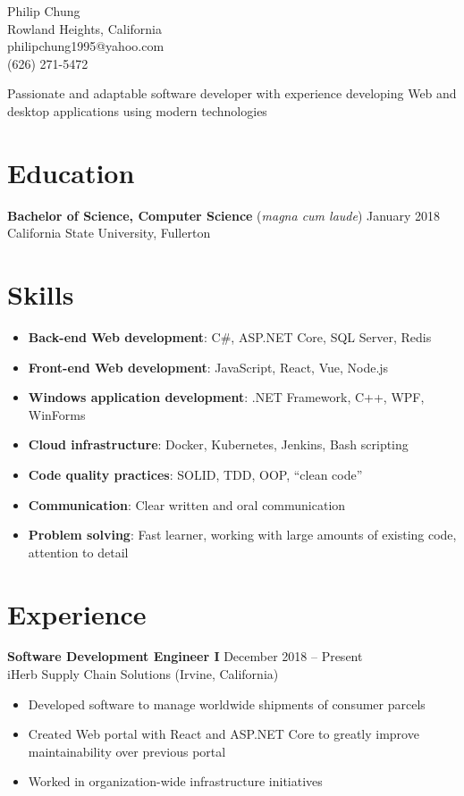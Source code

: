 \documentclass[10pt]{article}
\newcommand{\baseheader}[3]{#1 \hfill #2 \\ #3}
\newcommand{\locheader}[4]{\baseheader{\textbf{#1}}{#2}{#3 (#4)}}
\begin{document}
	\begin{center}
		{\LARGE Philip Chung} \\
		Rowland Heights, California \\
		philipchung1995@yahoo.com \\
		(626) 271-5472 \\
	\end{center}

	Passionate and adaptable software developer with experience developing Web and desktop applications using modern technologies

	\section*{Education}

	\baseheader{\textbf{Bachelor of Science, Computer Science} (\textit{magna cum laude})}{January 2018}{California State University, Fullerton}

	\section*{Skills}

	\newcommand{\skillitem}[2]{\item \textbf{#1}: #2}

	\begin{itemize}
		\skillitem{Back-end Web development}{C\#, ASP.NET Core, SQL Server, Redis}
		\skillitem{Front-end Web development}{JavaScript, React, Vue, Node.js}
		\skillitem{Windows application development}{.NET Framework, C++, WPF, WinForms}
		\skillitem{Cloud infrastructure}{Docker, Kubernetes, Jenkins, Bash scripting}
		\skillitem{Code quality practices}{SOLID, TDD, OOP, ``clean code''}
		\skillitem{Communication}{Clear written and oral communication}
		\skillitem{Problem solving}{Fast learner, working with large amounts of existing code, attention to detail}
	\end{itemize}

	\section*{Experience}

	\locheader{Software Development Engineer I}{December 2018 -- Present}{iHerb Supply Chain Solutions}{Irvine, California}

	\begin{itemize}
		\item Developed software to manage worldwide shipments of consumer parcels
		\item Created Web portal with React and ASP.NET Core to greatly improve maintainability over previous portal
		\item Worked in organization-wide infrastructure initiatives
	\end{itemize}
\end{document}
